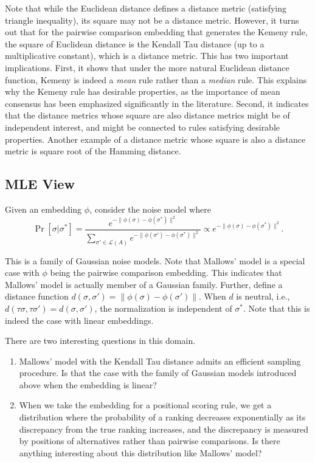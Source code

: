 \documentclass[prodmode,acmec]{ec-acmsmall}
\newcommand{\calL}{{\mathcal{L}}}
\newcommand{\rank}{{\calL(A)}}
\begin{document}
Note that while the Euclidean distance defines a distance metric (satisfying triangle inequality), its square may not be a distance metric. However, it turns out that for the pairwise comparison embedding that generates the Kemeny rule, the square of Euclidean distance is the Kendall Tau distance (up to a multiplicative constant), which is a distance metric. This has two important implications. First, it shows that under the more natural Euclidean distance function, Kemeny is indeed a \emph{mean} rule rather than a \emph{median} rule. This explains why the Kemeny rule has desirable properties, as the importance of mean consensus has been emphasized significantly in the literature. Second, it indicates that the distance metrics whose square are also distance metrics might be of independent interest, and might be connected to rules satisfying desirable properties. Another example of a distance metric whose square is also a distance metric is square root of the Hamming distance.


\subsection{MLE View}
Given an embedding $\phi$, consider the noise model where 
$$
\Pr[\sigma | \sigma^*] = \frac{e^{-\|\phi(\sigma)-\phi(\sigma^*)\|^2}}{\sum_{\sigma' \in \rank} e^{-\|\phi(\sigma')-\phi(\sigma^*)\|^2}} \propto e^{-\|\phi(\sigma)-\phi(\sigma^*)\|^2}.
$$

This is a family of Gaussian noise models. Note that Mallows' model is a special case with $\phi$ being the pairwise comparison embedding. This indicates that Mallows' model is actually member of a Gaussian family. Further, define a distance function $d(\sigma,\sigma') = \|\phi(\sigma)-\phi(\sigma')\|$. When $d$ is neutral, i.e., $d(\tau \sigma,\tau \sigma') = d(\sigma,\sigma')$, the normalization is independent of $\sigma^*$. Note that this is indeed the case with linear embeddings. 

There are two interesting questions in this domain.
\begin{enumerate}
\item Mallows' model with the Kendall Tau distance admits an efficient sampling procedure. Is that the case with the family of Gaussian models introduced above when the embedding is linear? 
\item When we take the embedding for a positional scoring rule, we get a distribution where the probability of a ranking decreases exponentially as its discrepancy from the true ranking increases, and the discrepancy is measured by positions of alternatives rather than pairwise comparisons. Is there anything interesting about this distribution like Mallows' model?
\end{enumerate}
\end{document}
